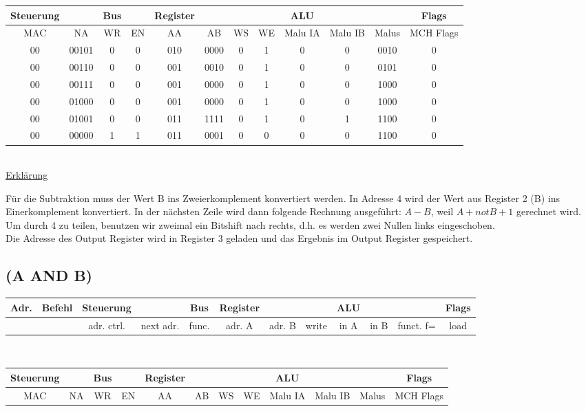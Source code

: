 \documentclass[paper=a4, fontsize=11pt]{scrartcl}
\numberwithin{equation}{section}
\numberwithin{figure}{section}
\numberwithin{table}{section}
\begin{document}
\begin{tabular}{|cc|cc|cccc|ccc|c|}
\hline
Steuerung & & Bus & & Register & & & & ALU & & & Flags \\
\hline
MAC & NA & WR & EN & AA & AB & WS & WE & Malu IA & Malu IB & Malus & MCH Flags \\
\hline
00 & 00101 & 0 & 0 & 010 & 0000 & 0 & 1 & 0 & 0 & 0010 & 0 \\
\hline
00 & 00110 & 0 & 0 & 001 & 0010 & 0 & 1 & 0 & 0 & 0101 & 0 \\
\hline
00 & 00111 & 0 & 0 & 001 & 0000 & 0 & 1 & 0 & 0 & 1000 & 0 \\
\hline
00 & 01000 & 0 & 0 & 001 & 0000 & 0 & 1 & 0 & 0 & 1000 & 0 \\
\hline
00 & 01001 & 0 & 0 & 011 & 1111 & 0 & 1 & 0 & 1 & 1100 & 0 \\
\hline
00 & 00000 & 1 & 1 & 011 & 0001 & 0 & 0 & 0 & 0 & 1100 & 0 \\
\hline
\end{tabular} \\

\underline{Erklärung}

Für die Subtraktion muss der Wert B ins Zweierkomplement konvertiert werden. In Adresse 4 wird der Wert aus Register 2 (B) ins Einerkomplement konvertiert. In der nächsten Zeile wird dann folgende Rechnung ausgeführt: $A-B$, weil $A+ notB +1$ gerechnet wird. Um durch 4 zu teilen, benutzen wir zweimal ein Bitshift nach rechts, d.h. es werden zwei Nullen links eingeschoben. \\
Die Adresse des Output Register wird in Register 3 geladen und das Ergebnis im Output Register gespeichert.


\subsection{(A AND B)}

\begin{tabular}{|c|c|cc|c|ccc|ccc|c|}
\hline
Adr. & Befehl &Steuerung & & Bus & Register & & & ALU & & & Flags \\
\hline
& & adr. ctrl. & next adr. & func. & adr. A & adr. B & write & in A & in B & funct. f= & load \\
\hline
\end{tabular} \\

\begin{tabular}{|cc|cc|cccc|ccc|c|}
\hline
Steuerung & & Bus & & Register & & & & ALU & & & Flags \\
\hline
MAC & NA & WR & EN & AA & AB & WS & WE & Malu IA & Malu IB & Malus & MCH Flags \\
\hline
\end{tabular} \\
\end{document}
